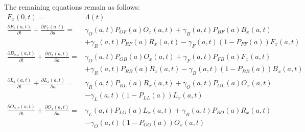 \documentclass{article}
\begin{document}
The remaining equations remain as follows: 
%
\begin{equation}\begin{array}{rl}
F_{x}(0,t) =& \Lambda(t) \\
%
\frac{\partial F_{x}(a,t)}{\partial t} + \frac{\partial
F_{x}(a,t)}{\partial a} =&
\gamma_O(a,t) P_{OF}(a) O_x(a,t)
+ \gamma_B(a,t) P_{BF}(a) B_x(a,t)\\ &
 + \gamma_R(a,t) P_{RF}(a) R_x(a,t)
- \gamma_F(a,t) (1-P_{FF}(a)) F_{x}(a,t)\\
%
%
\frac{\partial B_{o,x}(a,t)}{\partial t} + \frac{\partial
B_{x}(a,t)}{\partial a} =&  \gamma_O(a,t) P_{OB}(a) O_x(a,t) +
\gamma_F(a,t) P_{FB}(a) F_x(a,t)\\ &
+ \gamma_R(a,t) P_{RB}(a) R_x(a,t) 
- \gamma_B(a,t) (1 - P_{BB}(a)) B_{x}(a,t)\\
%

\frac{\partial L_{x} (a,t)}{\partial t} + \frac{\partial
L_{x} (a,t)}{\partial a} =& \gamma_R(a,t) P_{RL}(a) R_x(a,t) +
\gamma_O(a,t) P_{OL}(a) O_x(a,t) \\&
- \gamma_L(a,t) (1 - P_{LL}(a)) L_{x}(a,t)
\\
%
\frac{\partial O_{o,x}(a,t)}{\partial t} + \frac{\partial
O_{x}(a,t)}{\partial a} =& \gamma_L(a,t) P_{LO}(a) L_x(a,t)
+ \gamma_R(a,t) P_{RO}(a) R_x(a,t)
\\&
- \gamma_O(a,t) (1 - P_{OO}(a)) O_{x}(a,t)
\\
%
\end{array}\end{equation}
%
\end{document}
